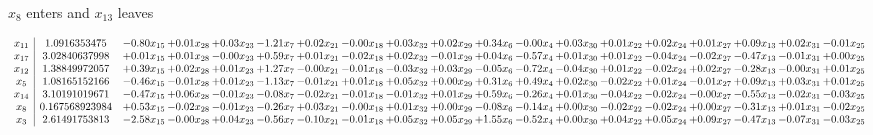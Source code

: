 \documentclass[9pt]{article}
\begin{document}
 $ x_{8} $ enters and $ x_{13} $ leaves 

 \[\begin{array}{c| c c@{\hskip 2pt} c@{\hskip 2pt} c@{\hskip 2pt} c@{\hskip 2pt} c@{\hskip 2pt} c@{\hskip 2pt} c@{\hskip 2pt} c@{\hskip 2pt} c@{\hskip 2pt} c@{\hskip 2pt} c@{\hskip 2pt} c@{\hskip 2pt} c@{\hskip 2pt} c@{\hskip 2pt} c@{\hskip 2pt} c@{\hskip 2pt} c@{\hskip 2pt} }
 x_{11}   &  1.0916353475 & -0.80 x_{15} & +  0.01 x_{28} & +  0.03 x_{23} & -1.21 x_{7} & +  0.02 x_{21} & -0.00 x_{18} & +  0.03 x_{32} & +  0.02 x_{29} & +  0.34 x_{6} & -0.00 x_{4} & +  0.03 x_{30} & +  0.01 x_{22} & +  0.02 x_{24} & +  0.01 x_{27} & +  0.09 x_{13} & +  0.02 x_{31} & -0.01 x_{25}\\
 x_{17}   &  3.02840637998 & +  0.01 x_{15} & +  0.01 x_{28} & -0.00 x_{23} & +  0.59 x_{7} & +  0.01 x_{21} & -0.02 x_{18} & +  0.02 x_{32} & -0.01 x_{29} & +  0.04 x_{6} & -0.57 x_{4} & +  0.01 x_{30} & +  0.01 x_{22} & -0.04 x_{24} & -0.02 x_{27} & -0.47 x_{13} & -0.01 x_{31} & +  0.00 x_{25}\\
 x_{12}   &  1.38849972057 & +  0.39 x_{15} & +  0.02 x_{28} & +  0.01 x_{23} & +  1.27 x_{7} & -0.00 x_{21} & -0.01 x_{18} & -0.03 x_{32} & +  0.03 x_{29} & -0.05 x_{6} & -0.72 x_{4} & -0.04 x_{30} & +  0.01 x_{22} & -0.02 x_{24} & +  0.02 x_{27} & -0.28 x_{13} & -0.00 x_{31} & +  0.01 x_{25}\\
 x_{5}   &  1.08165152166 & -0.46 x_{15} & -0.01 x_{28} & +  0.01 x_{23} & -1.13 x_{7} & -0.01 x_{21} & +  0.01 x_{18} & +  0.05 x_{32} & +  0.00 x_{29} & +  0.31 x_{6} & +  0.49 x_{4} & +  0.02 x_{30} & -0.02 x_{22} & +  0.01 x_{24} & -0.01 x_{27} & +  0.09 x_{13} & +  0.03 x_{31} & +  0.01 x_{25}\\
 x_{14}   &  3.10191019671 & -0.47 x_{15} & +  0.06 x_{28} & -0.01 x_{23} & -0.08 x_{7} & -0.02 x_{21} & -0.01 x_{18} & -0.01 x_{32} & +  0.01 x_{29} & +  0.59 x_{6} & -0.26 x_{4} & +  0.01 x_{30} & -0.04 x_{22} & -0.02 x_{24} & -0.00 x_{27} & -0.55 x_{13} & -0.02 x_{31} & -0.03 x_{25}\\
 x_{8}   &  0.167568923984 & +  0.53 x_{15} & -0.02 x_{28} & -0.01 x_{23} & -0.26 x_{7} & +  0.03 x_{21} & -0.00 x_{18} & +  0.01 x_{32} & +  0.00 x_{29} & -0.08 x_{6} & -0.14 x_{4} & +  0.00 x_{30} & -0.02 x_{22} & -0.02 x_{24} & +  0.00 x_{27} & -0.31 x_{13} & +  0.01 x_{31} & -0.02 x_{25}\\
 x_{3}   &  2.61491753813 & -2.58 x_{15} & -0.00 x_{28} & +  0.04 x_{23} & -0.56 x_{7} & -0.10 x_{21} & -0.01 x_{18} & +  0.05 x_{32} & +  0.05 x_{29} & +  1.55 x_{6} & -0.52 x_{4} & +  0.00 x_{30} & +  0.04 x_{22} & +  0.05 x_{24} & +  0.09 x_{27} & -0.47 x_{13} & -0.07 x_{31} & -0.03 x_{25}\\

\end{array}\]
\end{document}
